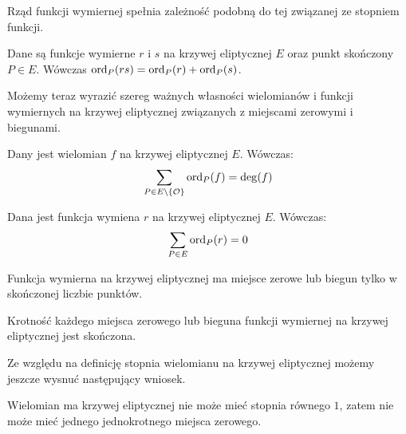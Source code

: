 \noindent
Rząd funkcji wymiernej spełnia zależność
podobną do tej związanej ze stopniem funkcji.

\begin{theorem}
Dane są funkcje wymierne $r$ i $s$ na krzywej eliptycznej $E$
oraz punkt skończony $P \in E$.
Wówczas $\operatorname{ord}_P(rs) = \operatorname{ord}_P(r) + \operatorname{ord}_P(s)$.
\end{theorem}

\noindent
Możemy teraz wyrazić szereg ważnych własności
wielomianów i funkcji wymiernych na krzywej eliptycznej
związanych z miejscami zerowymi i biegunami.

\begin{theorem}\label{polynomial_ord_deg_theorem}
Dany jest wielomian $f$ na krzywej eliptycznej $E$.
Wówczas:
\begin{equation*}
\sum_{P \in E\setminus \{\mathcal{O}\}} \operatorname{ord}_P(f) = \deg(f)
\end{equation*}
\end{theorem}

\begin{corollary}\label{function_order_sum_zero_corollary}
Dana jest funkcja wymiena $r$ na krzywej eliptycznej $E$.
Wówczas:
\begin{equation*}
\sum_{P \in E} \operatorname{ord}_P(r) = 0
\end{equation*}
\end{corollary}

\begin{corollary}
Funkcja wymierna na krzywej eliptycznej ma miejsce zerowe lub biegun
tylko w skończonej liczbie punktów.
\end{corollary}

\begin{corollary}
Krotność każdego miejsca zerowego lub bieguna
funkcji wymiernej na krzywej eliptycznej
jest skończona.
\end{corollary}

\noindent
Ze względu na definicję stopnia wielomianu na krzywej eliptycznej
możemy jeszcze wysnuć następujący wniosek.

\begin{corollary}\label{poly_no_single_zero_corollary}
Wielomian ma krzywej eliptycznej nie może mieć stopnia równego $1$,
zatem nie może mieć jednego jednokrotnego miejsca zerowego.
\end{corollary}
